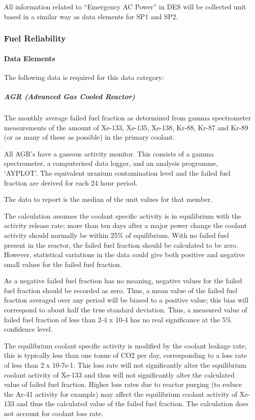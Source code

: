 All information related to “Emergency AC Power” in DES will be
collected unit based in a similar way as data elements for SP1 and
SP2.

\subsubsection{Fuel Reliability}

\paragraph{Data Elements}

The following data is required for this data category:

\subparagraph{AGR (Advanced Gas Cooled Reactor)}

The monthly average failed fuel fraction as determined from gamma
spectrometer measurements of the amount of Xe-133, Xe-135, Xe-138,
Kr-88, Kr-87 and Kr-89 (or as many of these as possible) in the
primary coolant.

All AGR's have a gaseous activity monitor. This consists of a gamma
spectrometer, a computerised data logger, and an analysis programme,
‘AYPLOT’. The equivalent uranium contamination level and the failed
fuel fraction are derived for each 24 hour period.

The data to report is the median of the unit values for that member.

The calculation assumes the coolant specific activity is in
equilibrium with the activity release rate; more than ten days after a
major power change the coolant activity should normally be within 25\%
of equilibrium. With no failed fuel present in the reactor, the failed
fuel fraction should be calculated to be zero. However, statistical
variations in the data could give both positive and negative small
values for the failed fuel fraction.

As a negative failed fuel fraction has no meaning, negative values for the failed fuel fraction should be recorded as zero. Thus, a mean value of the failed fuel fraction averaged over any period will be biased to a positive value; this bias will correspond to about half the true standard deviation.
Thus, a measured value of failed fuel fraction of less than 2-4 x 10-4
has no real significance at the 5\% confidence level.

The equilibrium coolant specific activity is modified by the coolant
leakage rate; this is typically less than one tonne of CO2 per day,
corresponding to a loss rate of less than 2 x 10-7s-1. This loss rate
will not significantly alter the equilibrium coolant activity of
Xe-133 and thus will not significantly alter the calculated value of
failed fuel fraction. Higher loss rates due to reactor purging (to
reduce the Ar-41 activity for example) may affect the equilibrium
coolant activity of Xe-133 and thus the calculated value of the failed
fuel fraction. The calculation does not account for coolant loss rate.

